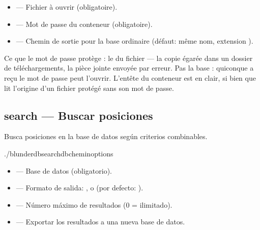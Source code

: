 \documentclass[letterpaper,10pt,spanish]{sphinxmanual}
\begin{document}
\sphinxAtStartPar
{}
\begin{itemize}
\item {} 
\sphinxAtStartPar
{} — Fichier  à ouvrir (obligatoire).

\item {} 
\sphinxAtStartPar
{} — Mot de passe du conteneur (obligatoire).

\item {} 
\sphinxAtStartPar
{} — Chemin de sortie pour la base ordinaire (défaut: même nom,
extension ).

\end{itemize}

\sphinxAtStartPar
Ce que le mot de passe protège : le  du fichier — la copie égarée
dans un dossier de téléchargements, la pièce jointe envoyée par erreur. Pas la
base : quiconque a reçu le mot de passe peut l’ouvrir. L’en\sphinxhyphen{}tête du conteneur
est en clair, si bien que  lit l’origine d’un fichier
protégé sans son mot de passe.


\subsection{search — Buscar posiciones}
\label{\detokenize{cli:search-rechercher-des-positions}}
\sphinxAtStartPar
Busca posiciones en la base de datos según criterios combinables.

\begin{sphinxVerbatim}[commandchars=\\\{\}]
./blunderdbsearch\PYGZhy{}\PYGZhy{}db\PYGZlt{}chemin\PYGZgt{}\PYG{o}{[}options\PYG{o}{]}
\end{sphinxVerbatim}

\sphinxAtStartPar
{}
\begin{itemize}
\item {} 
\sphinxAtStartPar
{} — Base de datos (obligatorio).

\item {} 
\sphinxAtStartPar
{} — Formato de salida: ,  o  (por defecto: ).

\item {} 
\sphinxAtStartPar
{} — Número máximo de resultados (0 = ilimitado).

\item {} 
\sphinxAtStartPar
{} — Exportar los resultados a una nueva base de datos.

\end{itemize}
\end{document}
